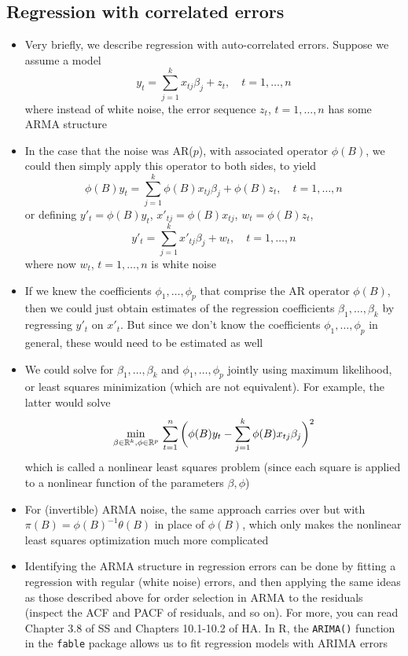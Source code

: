 \documentclass{article}
\begin{document}
\subsection{Regression with correlated errors}

\begin{itemize}
\item Very briefly, we describe regression with auto-correlated errors. Suppose
  we assume a model 
  \[
  y_t = \sum_{j=1}^k x_{tj} \beta_j + z_t, \quad t = 1,\dots,n
  \]
  where instead of white noise, the error sequence $z_t$, $t = 1,\dots,n$ has
  some ARMA structure

\item In the case that the noise was AR($p$), with associated operator
  $\phi(B)$, we could then simply apply this operator to both sides, to yield 
  \[
  \phi(B) y_t = \sum_{j=1}^k \phi(B) x_{tj} \beta_j + \phi(B) z_t, \quad t =
  1,\dots,n  
  \]
  or defining $y'_t = \phi(B) y_t$, $x'_{tj} = \phi(B) x_{tj}$, $w_t = \phi(B)
  z_t$,  
  \[
  y'_t = \sum_{j=1}^k x'_{tj} \beta_j + w_t, \quad t = 1,\dots,n
  \]
  where now $w_t$, $t = 1,\dots,n$ is white noise

\item If we knew the coefficients $\phi_1,\dots,\phi_p$ that comprise the AR
  operator $\phi(B)$, then we could just obtain estimates of the regression
  coefficients $\beta_1,\dots,\beta_k$ by regressing $y'_t$ on $x'_t$. But since
  we don't know the coefficients $\phi_1,\dots,\phi_p$ in general, these would
  need to be estimated as well

\item We could solve for $\beta_1,\dots,\beta_k$ and $\phi_1,\dots,\phi_p$
  jointly using maximum likelihood, or least squares minimization (which are not
  equivalent). For example, the latter would solve  
  \[
  \min_{\beta \in \mathbb{R}^k, \phi \in \mathbb{R}^p} \, \sum_{t=1}^n \bigg( \phi(B) y_t -
  \sum_{j=1}^k \phi(B) x_{tj} \beta_j \bigg)^2
  \]
  which is called a nonlinear least squares problem (since each square is
  applied to a nonlinear function of the parameters $\beta,\phi$)

\item For (invertible) ARMA noise, the same approach carries over but with
  $\pi(B) = \phi(B)^{-1} \theta(B)$ in place of $\phi(B)$, which only makes the
  nonlinear least squares optimization much more complicated

\item Identifying the ARMA structure in regression errors can be done by fitting
  a regression with regular (white noise) errors, and then applying the same
  ideas as those described above for order selection in ARMA to the residuals
  (inspect the ACF and PACF of residuals, and so on). For more, you can read
  Chapter 3.8 of SS and Chapters 10.1-10.2 of HA. In R, the \verb|ARIMA()|
  function in the \verb|fable| package allows us to fit regression models with
  ARIMA errors  
\end{itemize}
\end{document}
